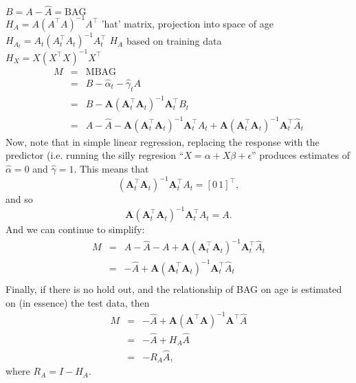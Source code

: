 \documentclass[40pt]{article}
\begin{document}
$B = A - \hat{A} = \text{BAG}$ \\

$H_A = A (A^{\top}A)^{-1}A^{\top}$ 'hat' matrix, projection into space of age\\

$H_{A_t} = A_t (A_t^{\top}A_t)^{-1}A_t^{\top}$ $H_A$ based on training data\\

$H_X = X (X^{\top}X)^{-1}X^{\top}$ \\

\begin{eqnarray}
  M &=& \mathrm{MBAG}\\
  &=& B -  \hat{\alpha}_t - \hat{\gamma}_t A\\
  &=& B - \mathbf{A}(\mathbf{A}_t^\top \mathbf{A}_t)^{-1}\mathbf{A}_t^\top B_t\\
  &=& A-\hat{A} - \mathbf{A}(\mathbf{A}_t^\top\mathbf{A}_t)^{-1}\mathbf{A}_t^\top A_t + \mathbf{A}(\mathbf{A}_t^\top \mathbf{A}_t)^{-1}\mathbf{A}_t^\top \hat{A}_t
\end{eqnarray}
Now, note that in simple linear regression, replacing the response with the predictor (i.e. running the silly regresion ``$X=\alpha+X\beta+\epsilon$'' produces estimates of $\hat\alpha=0$ and $\hat\gamma=1$.  This means that 
$$
(\mathbf{A}_t^\top\mathbf{A}_t)^{-1}\mathbf{A}_t^\top A_t=[0\,1]^\top,
$$
 and so 
$$
\mathbf{A}(\mathbf{A}_t^\top\mathbf{A}_t)^{-1}\mathbf{A}_t^\top A_t=A.
$$
And we can continue to simplify:
\begin{eqnarray}
  M 
  &=& A-\hat{A} - A + \mathbf{A}(\mathbf{A}_t^\top \mathbf{A}_t)^{-1}\mathbf{A}_t^\top\hat{A}_t\\
  &=& -\hat{A} + \mathbf{A}(\mathbf{A}_t^\top \mathbf{A}_t)^{-1}\mathbf{A}_t^\top\hat{A}_t\\
\end{eqnarray}
Finally, if there is no hold out, and the relationship of BAG on age is estimated on (in essence) the test data, then 
\begin{eqnarray}
  M 
  &=& -\hat{A} + \mathbf{A}(\mathbf{A}^\top \mathbf{A})^{-1}\mathbf{A}^\top\hat{A}\\
  &=& -\hat{A} + H_{A} \hat{A}\\
  &=& -R_A  \hat{A},
\end{eqnarray}
where $R_A=I-H_A$. \\
\end{document}
